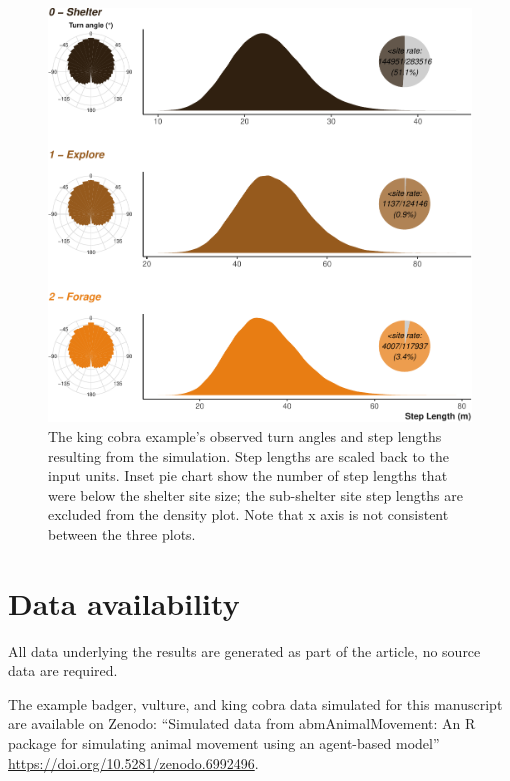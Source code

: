 \documentclass[10pt,a4paper]{article}
\begin{document}
\begin{figure}

{\centering \includegraphics{Agent-based_model_walkthrough_files/figure-latex/KINGCOBRAmoveCharFigure-1} 

}

\caption{The king cobra example's observed turn angles and step lengths resulting from the simulation. Step lengths are scaled back to the input units. Inset pie chart show the number of step lengths that were below the shelter site size; the sub-shelter site step lengths are excluded from the density plot. Note that x axis is not consistent between the three plots.}\label{fig:KINGCOBRAmoveCharFigure}
\end{figure}

\clearpage

\hypertarget{data-availability}{%
\section{Data availability}\label{data-availability}}

All data underlying the results are generated as part of the article, no source data are required.

The example badger, vulture, and king cobra data simulated for this manuscript are available on Zenodo: ``Simulated data from abmAnimalMovement: An R package for simulating animal movement using an agent-based model'' \url{https://doi.org/10.5281/zenodo.6992496}.
\end{document}
